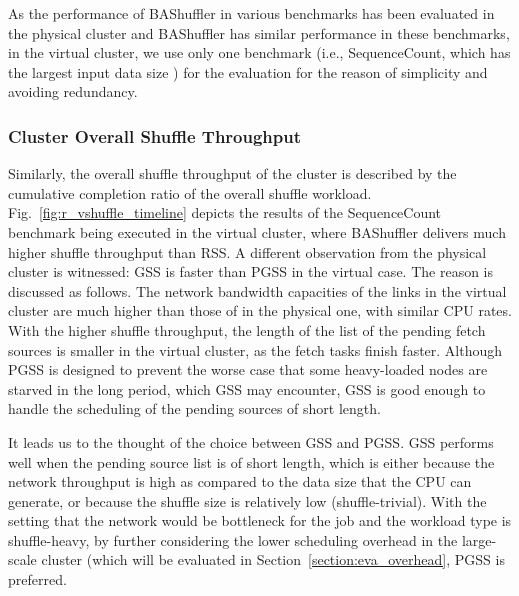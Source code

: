 \documentclass[10pt,journal,compsoc]{IEEEtran}
\begin{document}
As the performance of BAShuffler in various benchmarks has been
evaluated in the physical cluster
and BAShuffler has similar performance in these benchmarks, in the virtual cluster, 
we use only one benchmark (i.e., SequenceCount, which has the largest
input data size ) for the evaluation for the reason of simplicity and avoiding redundancy.

\subsubsection{Cluster Overall Shuffle Throughput}
Similarly, the overall shuffle throughput of the cluster is described by the cumulative completion ratio of the overall shuffle workload. 
Fig.~\ref{fig:r_vshuffle_timeline} depicts the results of the
SequenceCount benchmark being executed in the virtual cluster, 
where BAShuffler delivers much higher shuffle throughput than RSS. 
A different observation from the physical cluster is witnessed: GSS is faster than PGSS in the virtual case. 
The reason is discussed as follows. 
The network bandwidth capacities of the links in the virtual cluster are much higher than those of in the physical one, with similar CPU rates. 
With the higher shuffle throughput, the length of the list of the pending fetch sources is smaller in the virtual cluster, as the fetch tasks finish faster. 
Although PGSS is designed to prevent the worse
case that some heavy-loaded nodes are starved in the long period, which GSS may encounter, 
GSS is good enough to handle the scheduling of the pending sources of short length. 

It leads us to the thought of the choice between GSS and PGSS. 
GSS performs well when the pending source list is of short length, which is either because the network throughput is high as compared to the data size that the CPU can generate, or because the shuffle size is relatively low (shuffle-trivial). With the setting that the network would be bottleneck for the job and the workload type is shuffle-heavy, by further considering the lower scheduling overhead in the large-scale cluster (which will be evaluated in Section~\ref{section:eva_overhead}, PGSS is preferred. 

\end{document}
